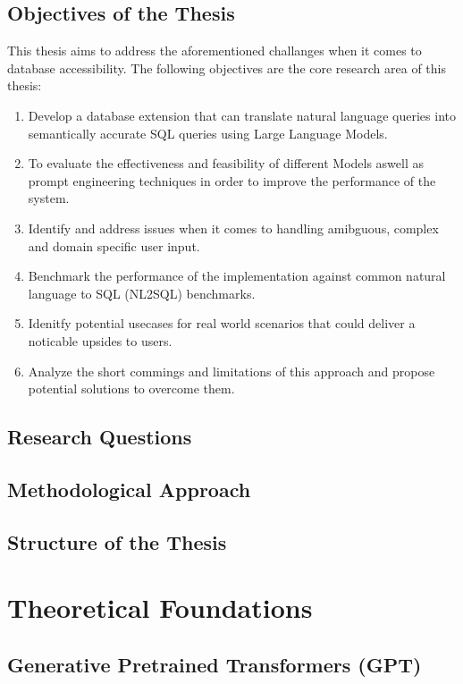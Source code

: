 \documentclass{article}
\begin{document}
\subsection{Objectives of the Thesis}

This thesis aims to address the aforementioned challanges when it comes to database accessibility.
The following objectives are the core research area of this thesis:

\begin{enumerate}
    \item Develop a database extension that can translate natural language queries into semantically
          accurate SQL queries using Large Language Models.
    \item To evaluate the effectiveness and feasibility of different Models aswell as prompt engineering
          techniques in order to improve the performance of the system.
    \item Identify and address issues when it comes to handling amibguous, complex and domain specific user input.
    \item Benchmark the performance of the implementation against common natural language to SQL (NL2SQL) benchmarks.
    \item Idenitfy potential usecases for real world scenarios that could deliver a noticable upsides to users.
    \item Analyze the short commings and limitations of this approach and propose potential solutions to overcome them.
\end{enumerate}  

\subsection{Research Questions}
\subsection{Methodological Approach}
\subsection{Structure of the Thesis}

\newpage

\section{Theoretical Foundations}

\subsection{Generative Pretrained Transformers (GPT)}
\end{document}

